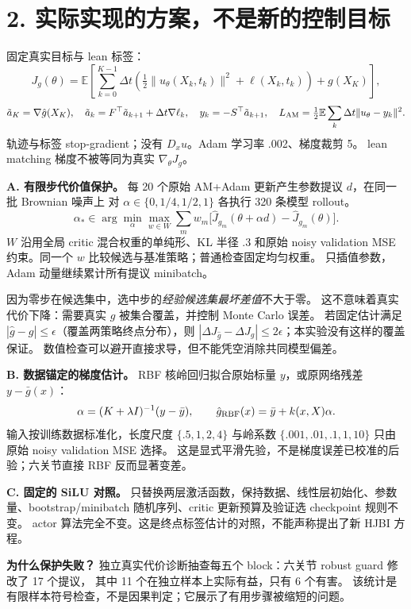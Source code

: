 \documentclass[10pt,a4paper]{article}
\begin{document}
\section*{2. 实际实现的方案，不是新的控制目标}
固定真实目标与 lean 标签：
\[
J_g(\theta)=\mathbb E\!\left[\sum_{k=0}^{K-1}\Delta t
\left(\tfrac12\|u_\theta(X_k,t_k)\|^2+\ell(X_k,t_k)\right)+g(X_K)\right],
\]
\[
\tilde a_K=\nabla\hat g(X_K),\quad
\tilde a_k=F^\top\tilde a_{k+1}+\Delta t\nabla\ell_k,\quad
y_k=-S^\top\tilde a_{k+1},\quad
L_{\rm AM}=\tfrac12\mathbb E\sum_k\Delta t\|u_\theta-y_k\|^2.
\]
轨迹与标签 stop-gradient；没有 $D_xu$。Adam 学习率 .002、梯度裁剪 5。
lean matching 梯度不被等同为真实 $\nabla_\theta J_g$。

\textbf{A. 有限步代价值保护。}
每 20 个原始 AM+Adam 更新产生参数提议 $d$，在同一批 Brownian 噪声上
对 $\alpha\in\{0,1/4,1/2,1\}$ 各执行 320 条模型 rollout。
\[
\alpha_*\in\arg\min_\alpha\max_{w\in W}
\sum_mw_m\big[\widehat J_{g_m}(\theta+\alpha d)-\widehat J_{g_m}(\theta)\big].
\]
$W$ 沿用全局 critic 混合权重的单纯形、KL 半径 .3 和原始 noisy validation
MSE 约束。同一个 $w$ 比较候选与基准策略；普通检查固定均匀权重。
只插值参数，Adam 动量继续累计所有提议 minibatch。

因为零步在候选集中，选中步的\emph{经验候选集最坏差值}不大于零。
这不意味着真实代价下降：需要真实 $g$ 被集合覆盖，并控制 Monte Carlo 误差。
若固定估计满足 $|\hat g-g|\leq\epsilon$（覆盖两策略终点分布），则
$|\Delta J_{\hat g}-\Delta J_g|\leq2\epsilon$；本实验没有这样的覆盖保证。
数值检查可以避开直接求导，但不能凭空消除共同模型偏差。

\textbf{B. 数据锚定的梯度估计。}
RBF 核岭回归拟合原始标量 $y$，或原网络残差 $y-\bar g(x)$：
\[
\alpha=(K+\lambda I)^{-1}(y-\bar y),\qquad
\hat g_{\rm RBF}(x)=\bar y+k(x,X)\alpha.
\]
输入按训练数据标准化，长度尺度 $\{.5,1,2,4\}$ 与岭系数
$\{.001,.01,.1,1,10\}$ 只由原始 noisy validation MSE 选择。
这是显式平滑先验，不是梯度误差已校准的后验；六关节直接 RBF 反而显著变差。

\textbf{C. 固定的 SiLU 对照。}
只替换两层激活函数，保持数据、线性层初始化、参数量、bootstrap/minibatch
随机序列、critic 更新预算及验证选 checkpoint 规则不变。
actor 算法完全不变。这是终点标签估计的对照，不能声称提出了新 HJBI 方程。

\textbf{为什么保护失败？}
独立真实代价诊断抽查每五个 block：六关节 robust guard 修改了 17 个提议，
其中 11 个在独立样本上实际有益，只有 6 个有害。
该统计是有限样本符号检查，不是因果判定；它展示了有用步骤被缩短的问题。
\newpage
\end{document}
